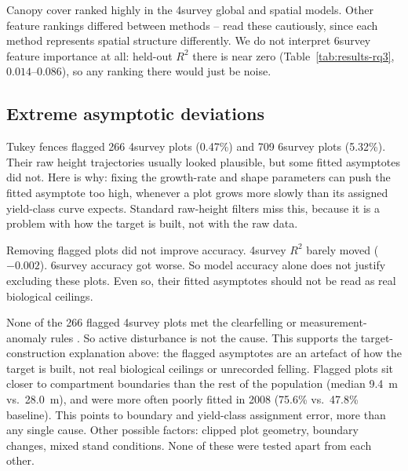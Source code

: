 Canopy cover ranked highly in the 4survey global and spatial models. Other feature rankings
differed between methods -- read these cautiously, since each method represents spatial structure
differently. We do not interpret 6survey feature importance at all: held-out $R^2$ there is near
zero (Table~\ref{tab:results-rq3}, $0.014$--$0.086$), so any ranking there would just be noise.


\subsection{Extreme asymptotic deviations}

Tukey fences flagged 266 4survey plots (0.47\%) and 709 6survey plots (5.32\%). Their raw height
trajectories usually looked plausible, but some fitted asymptotes did not. Here is why: fixing the
growth-rate and shape parameters can push the fitted asymptote too high, whenever a plot grows
more slowly than its assigned yield-class curve expects. Standard raw-height filters miss this,
because it is a problem with how the target is built, not with the raw data.

Removing flagged plots did not improve accuracy. 4survey $R^2$ barely moved ($-0.002$). 6survey
accuracy got worse. So model accuracy alone does not justify excluding these plots. Even so, their
fitted asymptotes should not be read as real biological ceilings.

None of the 266 flagged 4survey plots met the clearfelling or measurement-anomaly rules
. So active disturbance is not the cause. This supports the target-construction
explanation above: the flagged asymptotes are an artefact of how the target is built, not real
biological ceilings or unrecorded felling. Flagged plots sit closer to compartment boundaries than
the rest of the population (median 9.4~m vs.\ 28.0~m), and were more often poorly fitted in 2008
(75.6\% vs.\ 47.8\% baseline). This points to boundary and yield-class assignment error, more than
any single cause. Other possible factors: clipped plot geometry, boundary changes, mixed stand
conditions. None of these were tested apart from each other.

